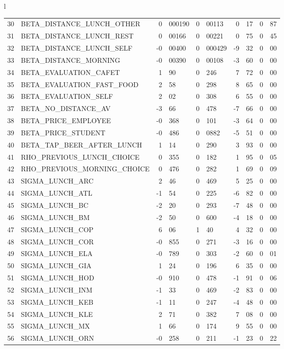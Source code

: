 \begin{tabular}{l}
\begin{tabular}{rlr@{.}lr@{.}lr@{.}lr@{.}l}
30 & BETA_DISTANCE_LUNCH_OTHER & 0&000190 & 0&00113 & 0&17 & 0&87\\
31 & BETA_DISTANCE_LUNCH_REST & 0&00166 & 0&00221 & 0&75 & 0&45\\
32 & BETA_DISTANCE_LUNCH_SELF & -0&00400 & 0&000429 & -9&32 & 0&00\\
33 & BETA_DISTANCE_MORNING & -0&00390 & 0&00108 & -3&60 & 0&00\\
34 & BETA_EVALUATION_CAFET & 1&90 & 0&246 & 7&72 & 0&00\\
35 & BETA_EVALUATION_FAST_FOOD & 2&58 & 0&298 & 8&65 & 0&00\\
36 & BETA_EVALUATION_SELF & 2&02 & 0&308 & 6&55 & 0&00\\
37 & BETA_NO_DISTANCE_AV & -3&66 & 0&478 & -7&66 & 0&00\\
38 & BETA_PRICE_EMPLOYEE & -0&368 & 0&101 & -3&64 & 0&00\\
39 & BETA_PRICE_STUDENT & -0&486 & 0&0882 & -5&51 & 0&00\\
40 & BETA_TAP_BEER_AFTER_LUNCH & 1&14 & 0&290 & 3&93 & 0&00\\
41 & RHO_PREVIOUS_LUNCH_CHOICE & 0&355 & 0&182 & 1&95 & 0&05\\
42 & RHO_PREVIOUS_MORNING_CHOICE & 0&476 & 0&282 & 1&69 & 0&09\\
43 & SIGMA_LUNCH_ARC & 2&46 & 0&469 & 5&25 & 0&00\\
44 & SIGMA_LUNCH_ATL  & -1&54 & 0&225 & -6&82 & 0&00\\
45 & SIGMA_LUNCH_BC & -2&20 & 0&293 & -7&48 & 0&00\\
46 & SIGMA_LUNCH_BM & -2&50 & 0&600 & -4&18 & 0&00\\
47 & SIGMA_LUNCH_COP & 6&06 & 1&40 & 4&32 & 0&00\\
48 & SIGMA_LUNCH_COR  & -0&855 & 0&271 & -3&16 & 0&00\\
49 & SIGMA_LUNCH_ELA & -0&789 & 0&303 & -2&60 & 0&01\\
50 & SIGMA_LUNCH_GIA  & 1&24 & 0&196 & 6&35 & 0&00\\
51 & SIGMA_LUNCH_HOD  & -0&910 & 0&478 & -1&91 & 0&06\\
52 & SIGMA_LUNCH_INM  & -1&33 & 0&469 & -2&83 & 0&00\\
53 & SIGMA_LUNCH_KEB  & -1&11 & 0&247 & -4&48 & 0&00\\
54 & SIGMA_LUNCH_KLE & 2&71 & 0&382 & 7&08 & 0&00\\
55 & SIGMA_LUNCH_MX  & 1&66 & 0&174 & 9&55 & 0&00\\
56 & SIGMA_LUNCH_ORN  & -0&258 & 0&211 & -1&23 & 0&22\\

\end{tabular}
\end{tabular}
